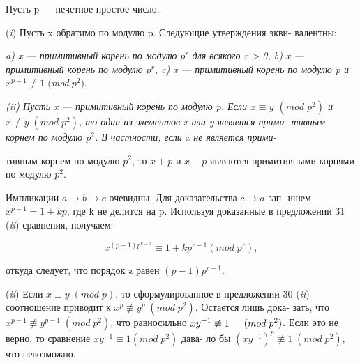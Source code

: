 \begin{thm}
\slshape{Пусть p --- нечетное простое число. \par 
(\textit{i}) Пусть x обратимо по модулю p. Следующие утверждения экви- \linebreak валентны: \linebreak}
\indent \slshape{a) x --- примитивный корень по модулю $p^{r}$ для всякого r > 0, \linebreak \indent b)\; x --- примитивный корень по модулю $p^{r}$, \linebreak \indent c) x --- примитивный корень по модулю p и $x^{p-1} \not\equiv 1 \; ($mod$ \; p^{2}).$ } \par 
\slshape{(\textit{ii}) Пусть x --- примитивный корень по модулю p. Если $x\equiv y$ 
\linebreak $(mod \; p^{2})$ и $x \not\equiv y \; (mod \; p^{2})$, то один из элементов x или y является прими- \linebreak тивным корнем по модулю $p^{2}$. В частности, если x не является прими- } \linebreak \newpage


\noindent тивным корнем по модулю $p^{2}$, то $x+p$ и $x-p$ являются примитивными корнями по модулю $p^{2}$. 
\end{thm}
 \begin{myproof}
Импликации $a \rightarrow b \rightarrow c$ очевидны. Для доказательства $c \rightarrow a$ зап- \linebreak \indent ишем $x^{p-1} = 1 + kp$, где k не делится на p. Используя доказанные в \linebreak \indent предложении 31 (\textit{ii}) сравнения, получаем: \par 
$$x^{(p-1)p^{r-2}} \equiv 1 + kp^{r-1} (mod \; p^{r}),$$ \par 
\indent откуда следует, что порядок \textit{x} равен $(p-1)p^{r-1}$. \par 
\indent (\textit{ii}) Если $x \equiv y \; (mod \; p)$, то сформулированное в предложении 30 (\textit{ii}) \linebreak \indent соотношение приводит к $x^{p} \not\equiv y^{p} \; (mod \; p^{2})$. Остается лишь дока- \linebreak \indent зать, что $x^{p-1} \not\equiv y^{p-1} \; (mod \; p^{2})$, что равносильно $xy^{-1} \not\equiv 1 \linebreak \indent (mod \; p^{2})$. Если это не верно, то сравнение $xy^{-1} \equiv
1(mod \; p^{2})$ дава- \linebreak \indent ло бы $(xy^{-1})^{p} \not\equiv 1 \; (mod \; p^{2})$, что невозможно.
\end{myproof}
